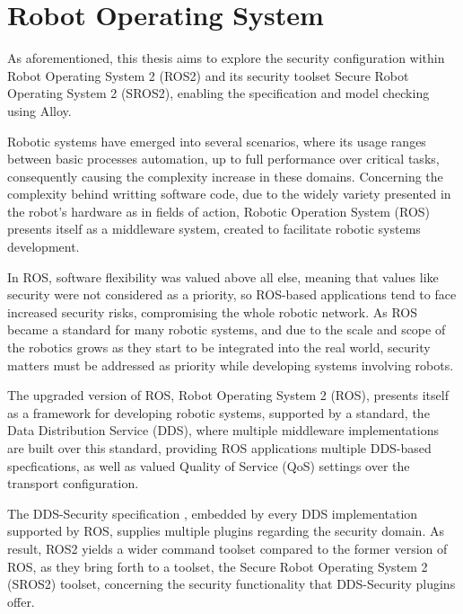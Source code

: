 \chapter{Robot Operating System}\label{c:ros}

As aforementioned, this thesis aims to explore the security configuration within Robot Operating System 2 (ROS2) and its security toolset Secure Robot Operating System 2 (SROS2), enabling the specification and model checking using Alloy. 


Robotic systems have emerged into several scenarios, where its usage ranges between basic processes automation, up to full performance over critical tasks, consequently causing the complexity increase in these domains. Concerning the complexity behind writting software code, due to the widely variety presented in the robot's hardware as in fields of action, Robotic Operation System (ROS) presents itself as a middleware system, created to facilitate robotic systems development.

In ROS, software flexibility was valued above all else, meaning that values like security were not considered as a priority, so ROS-based applications tend to face increased security risks, compromising the whole robotic network. As ROS became a standard for many robotic systems, and due to the scale and scope of the robotics grows as they start to be integrated into the real world, security matters must be addressed as priority while developing systems involving robots. \cite{diluoffo2018robot, kim2018security}

The upgraded version of ROS, Robot Operating System 2 (ROS), presents itself as a framework for developing robotic systems, supported by a standard, the Data Distribution Service (DDS), where multiple middleware implementations are built over this standard, providing ROS applications multiple DDS-based specfications, as well as valued Quality of Service (QoS) settings over the transport configuration. 

The DDS-Security specification \cite{dds-s}, embedded by every DDS implementation supported by ROS, supplies multiple plugins regarding the security domain. As result, ROS2 yields a wider command toolset compared to the former version of ROS, as they bring forth to a toolset, the Secure Robot Operating System 2 (SROS2) toolset, concerning the security functionality that DDS-Security plugins offer.

